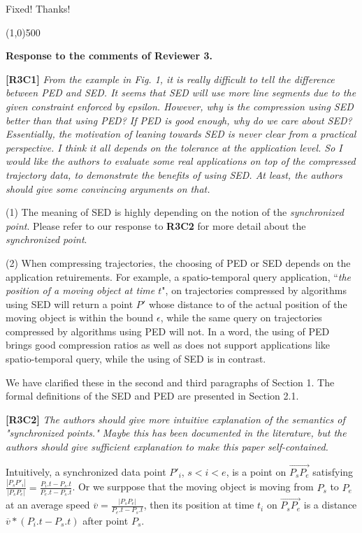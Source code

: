 \documentclass{letter}
\begin{document}
Fixed! Thanks!


\line(1,0){500}

\textbf{Response to the comments of Reviewer 3.}

\textbf{[R3C1]} \emph{From the example in Fig. 1, it is really difficult to tell the difference between PED and SED. It seems that SED will use more line segments due to the given constraint enforced by epsilon. However, why is the compression using SED better than that using PED? If PED is good enough, why do we care about SED? Essentially, the motivation of leaning towards SED is never clear from a practical perspective. I think it all depends on the tolerance at the application level. So I would like the authors to evaluate some real applications on top of the compressed trajectory data, to demonstrate the benefits of using SED. At least, the authors should give some convincing arguments on that.}

(1) The meaning of SED is highly depending on the notion of the \emph{synchronized point}. Please refer to our response to \textbf{R3C2} for more detail about the \emph{synchronized point}. 

(2) When compressing trajectories, the choosing of PED or SED depends on the application retuirements. For example, a spatio-temporal query application, ``\emph{the position of a moving object at time $t$}", on trajectories compressed by algorithms using SED will return a point $P'$ whose distance to of the actual position of the moving object is within the bound $\epsilon$, while the same query on trajectories compressed by algorithms using PED will not. In a word, the using of PED brings good compression ratios as well as does not support applications like spatio-temporal query, while the using of SED is in contrast.

We have clarified these in the second and third paragraphs of Section 1. 
The formal definitions of the SED and PED are presented in Section 2.1.


\textbf{[R3C2]} \emph{The authors should give more intuitive explanation of the semantics of "synchronized points." Maybe this has been documented in the literature, but the authors should give sufficient explanation to make this paper self-contained.}

Intuitively, a synchronized data point $P'_i$, $s<i<e$, is a point on $\overrightarrow{P_sP_{e}}$ satisfying $\frac{|P_sP'_i|}{|P_sP_e|} = \frac{P_i.t - P_s.t}{P_e.t-P_s.t}$. 
Or we surppose that the moving object is moving from $P_s$ to $P_e$ at an average speed $\overline{v} = \frac{|P_sP_e|}{P_e.t-P_s.t}$, then its position at time $t_i$ on $\overrightarrow{P_sP_{e}}$ is a distance $\overline{v}*(P_i.t-P_s.t)$ after point $P_s$.
\end{document}
